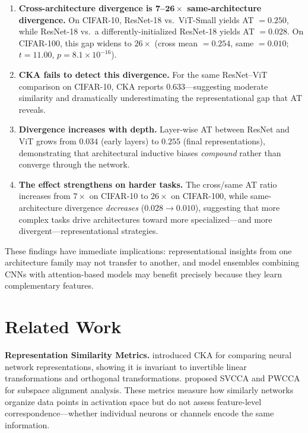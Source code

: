 \documentclass{article}
\begin{document}
\begin{enumerate}
    \item \textbf{Cross-architecture divergence is $\mathbf{7}$--$\mathbf{26\times}$ same-architecture divergence.} On CIFAR-10, ResNet-18 vs.\ ViT-Small yields AT $= 0.250$, while ResNet-18 vs.\ a differently-initialized ResNet-18 yields AT $= 0.028$. On CIFAR-100, this gap widens to $26\times$ (cross mean $= 0.254$, same $= 0.010$; $t = 11.00$, $p = 8.1 \times 10^{-16}$).
    \item \textbf{CKA fails to detect this divergence.} For the same ResNet--ViT comparison on CIFAR-10, CKA reports $0.633$---suggesting moderate similarity and dramatically underestimating the representational gap that AT reveals.
    \item \textbf{Divergence increases with depth.} Layer-wise AT between ResNet and ViT grows from $0.034$ (early layers) to $0.255$ (final representations), demonstrating that architectural inductive biases \emph{compound} rather than converge through the network.
    \item \textbf{The effect strengthens on harder tasks.} The cross/same AT ratio increases from $7\times$ on CIFAR-10 to $26\times$ on CIFAR-100, while same-architecture divergence \emph{decreases} ($0.028 \to 0.010$), suggesting that more complex tasks drive architectures toward more specialized---and more divergent---representational strategies.
\end{enumerate}

These findings have immediate implications: representational insights from one architecture family may not transfer to another, and model ensembles combining CNNs with attention-based models may benefit precisely because they learn complementary features.

\section{Related Work}
\label{sec:related}

\textbf{Representation Similarity Metrics.} \citet{kornblith2019similarity} introduced CKA for comparing neural network representations, showing it is invariant to invertible linear transformations and orthogonal transformations. \citet{morcos2018insights} proposed SVCCA and PWCCA for subspace alignment analysis. These metrics measure how similarly networks organize data points in activation space but do not assess feature-level correspondence---whether individual neurons or channels encode the same information.
\end{document}
